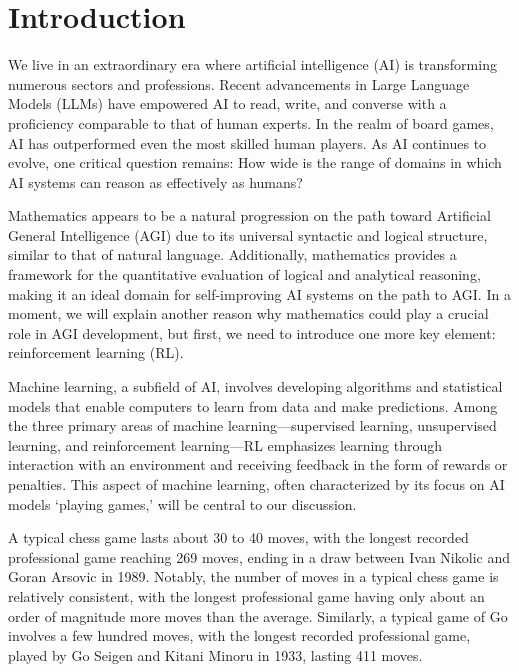 
\section{Introduction\label{sec:intro}}

We live in an extraordinary era where artificial intelligence (AI) is transforming numerous sectors and professions. Recent advancements in Large Language Models (LLMs) have empowered AI to read, write, and converse with a proficiency comparable to that of human experts. In the realm of board games, AI has outperformed even the most skilled human players. As AI continues to evolve, one critical question remains: How wide is the range of domains in which AI systems can reason as effectively as humans?

Mathematics appears to be a natural progression on the path toward Artificial General Intelligence (AGI) due to its universal syntactic and logical structure, similar to that of natural language. Additionally, mathematics provides a framework for the quantitative evaluation of logical and analytical reasoning, making it an ideal domain for self-improving AI systems on the path to AGI. In a moment, we will explain another reason why mathematics could play a crucial role in AGI development, but first, we need to introduce one more key element: reinforcement learning (RL).

Machine learning, a subfield of AI, involves developing algorithms and statistical models that enable computers to learn from data and make predictions. Among the three primary areas of machine learning---supervised learning, unsupervised learning, and reinforcement learning---RL emphasizes learning through interaction with an environment and receiving feedback in the form of rewards or penalties. This aspect of machine learning, often characterized by its focus on AI models `playing games,’ will be central to our discussion.

A typical chess game lasts about 30 to 40 moves, with the longest recorded professional game reaching 269 moves, ending in a draw between Ivan Nikolic and Goran Arsovic in 1989. Notably, the number of moves in a typical chess game is relatively consistent, with the longest professional game having only about an order of magnitude more moves than the average. Similarly, a typical game of Go involves a few hundred moves, with the longest recorded professional game, played by Go Seigen and Kitani Minoru in 1933, lasting 411 moves.

